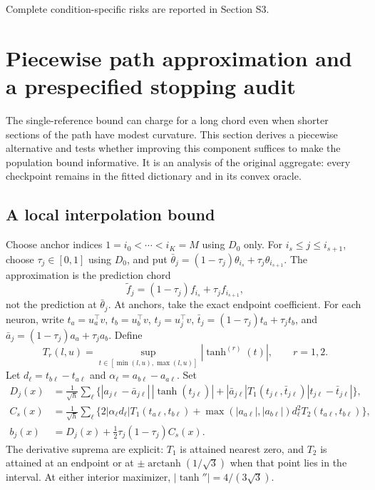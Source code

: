 \documentclass[pdflatex,sn-mathphys-ay]{sn-jnl}
\theoremstyle{remark}\newtheorem{remark}[theorem]{Remark}
\begin{document}
Complete condition-specific risks are reported in Section S3.

\section{Piecewise path approximation and a prespecified stopping audit}\label{sec:piecewiseaudit}
The single-reference bound can charge for a long chord even when shorter sections of the path have modest curvature. This section derives a piecewise alternative and tests whether improving this component suffices to make the population bound informative. It is an analysis of the original aggregate: every checkpoint remains in the fitted dictionary and in its convex oracle.

\subsection{A local interpolation bound}
Choose anchor indices $1=i_0<\cdots<i_K=M$ using $D_0$ only. For $i_s\leq j\leq i_{s+1}$, choose $\tau_j\in[0,1]$ using $D_0$, and put $\bar\theta_j=(1-\tau_j)\theta_{i_s}+\tau_j\theta_{i_{s+1}}$. The approximation is the prediction chord
\[
 \widetilde f_j=(1-\tau_j)f_{i_s}+\tau_j f_{i_{s+1}},
\]
not the prediction at $\bar\theta_j$. At anchors, take the exact endpoint coefficient. For each neuron, write $t_a=u_a^\top v$, $t_b=u_b^\top v$, $t_j=u_j^\top v$, $\bar t_j=(1-\tau_j)t_a+\tau_jt_b$, and $\bar a_j=(1-\tau_j)a_a+\tau_j a_b$. Define
\[
 T_r(l,u)=\sup_{t\in[\min(l,u),\max(l,u)]}|\tanh^{(r)}(t)|,\qquad r=1,2.
\]
Let $d_\ell=t_{b\ell}-t_{a\ell}$ and $\alpha_\ell=a_{b\ell}-a_{a\ell}$. Set
\begin{align}
 D_j(x)&=\frac1{\sqrt h}\sum_\ell\bigl\{
 |a_{j\ell}-\bar a_{j\ell}|\,|\tanh(t_{j\ell})|
 +|\bar a_{j\ell}|T_1(t_{j\ell},\bar t_{j\ell})|t_{j\ell}-\bar t_{j\ell}|\bigr\},\\
 C_s(x)&=\frac1{\sqrt h}\sum_\ell\bigl\{
 2|\alpha_\ell d_\ell|T_1(t_{a\ell},t_{b\ell})
 +\max(|a_{a\ell}|,|a_{b\ell}|)d_\ell^2T_2(t_{a\ell},t_{b\ell})\bigr\},\\
 b_j(x)&=D_j(x)+\tfrac12\tau_j(1-\tau_j)C_s(x).
 \label{eq:piecebound}
\end{align}
The derivative suprema are explicit: $T_1$ is attained nearest zero, and $T_2$ is attained at an endpoint or at $\pm\operatorname{arctanh}(1/\sqrt3)$ when that point lies in the interval. At either interior maximizer, $|\tanh''|=4/(3\sqrt3)$.
\end{document}
